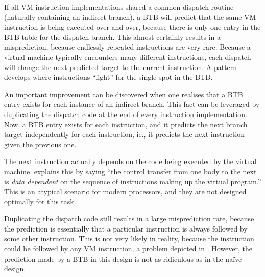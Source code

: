 		If all VM instruction implementations shared a common dispatch routine (naturally containing an indirect branch), a BTB will predict that the same VM instruction is being executed over and over, because there is only one entry in the BTB table for the dispatch branch. This almost certainly results in a misprediction, because endlessly repeated instructions are very rare. Because a virtual machine typically encounters many different instructions, each dispatch will change the next predicted target to the current instruction. A pattern develops where instructions ``fight'' for the single spot in the BTB.
		
		An important improvement can be discovered when one realises that a BTB entry exists for each instance of an indirect branch. This fact can be leveraged by duplicating the dispatch code at the end of every instruction implementation. Now, a BTB entry exists for each instruction, and it predicts the next branch target independently for each instruction, ie., it predicts the next instruction given the previous one.
		
		The next instruction actually depends on the code being executed by the virtual machine. \cite{yeti} explains this by saying ``the control transfer from one body to the next is \emph{data dependent} on the sequence of instructions making up the virtual program.'' This is an atypical scenario for modern processors, and they are not designed optimally for this task.
		
		Duplicating the dispatch code still results in a large misprediction rate, because the prediction is essentially that a particular instruction is always followed by some other instruction. This is not very likely in reality, because the instruction could be followed by any VM instruction, a problem depicted in . However, the prediction made by a BTB in this design is not as ridiculous as in the naïve design.
		
